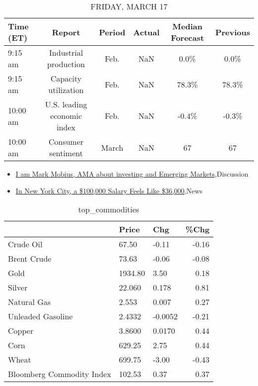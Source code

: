\documentclass{article}%
\begin{document}
%


\begin{table}[htbp]%
\caption{FRIDAY, MARCH 17}%
\centering%
\begin{adjustbox}{width=1\textwidth}%
\begin{tabular}{lccccc}
\toprule
Time (ET) &                      Report & Period & Actual & Median Forecast & Previous \\
\midrule
  9:15 am &       Industrial production &   Feb. &    NaN &            0.0\% &     0.0\% \\
  9:15 am &        Capacity utilization &   Feb. &    NaN &           78.3\% &    78.3\% \\
 10:00 am & U.S. leading economic index &   Feb. &    NaN &           -0.4\% &    -0.3\% \\
 10:00 am &          Consumer sentiment &  March &    NaN &              67 &       67 \\
\bottomrule
\end{tabular}
%
\end{adjustbox}%
\end{table}

%
\begin{itemize}%
\item%
\href{https://reddit.com/r/wallstreetbets/comments/11ss19c/i\_am\_mark\_mobius\_ama\_about\_investing\_and\_emerging/}{I am Mark Mobius, AMA about investing and Emerging Markets},Discussion%
\item%
\href{https://reddit.com/r/Economics/comments/11sr13g/in\_new\_york\_city\_a\_100000\_salary\_feels\_like\_36000/}{In New York City, a \$100,000 Salary Feels Like \$36,000},News%
\end{itemize}%


\begin{table}[htbp]%
\caption{top\_commodities}%
\centering%
\begin{adjustbox}{width=1\textwidth}%
\begin{tabular}{lllr}
\toprule
                          &   Price &     Chg &  \%Chg \\
\midrule
               Crude Oil  &   67.50 &   -0.11 & -0.16 \\
             Brent Crude  &   73.63 &   -0.06 & -0.08 \\
                    Gold  & 1934.80 &    3.50 &  0.18 \\
                  Silver  &  22.060 &   0.178 &  0.81 \\
             Natural Gas  &   2.553 &   0.007 &  0.27 \\
       Unleaded Gasoline  &  2.4332 & -0.0052 & -0.21 \\
                  Copper  &  3.8600 &  0.0170 &  0.44 \\
                    Corn  &  629.25 &    2.75 &  0.44 \\
                   Wheat  &  699.75 &   -3.00 & -0.43 \\
Bloomberg Commodity Index &  102.53 &    0.37 &  0.37 \\
\bottomrule
\end{tabular}
%
\end{adjustbox}%
\end{table}
\end{document}
